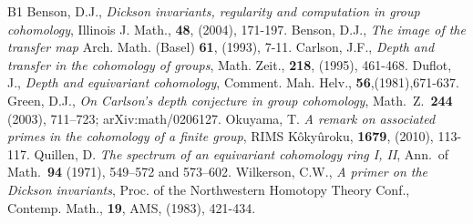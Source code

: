 \documentclass[reqno]{amsart}
\theoremstyle{plain}%
\theoremstyle{definition}
\theoremstyle{remark}
\begin{document}
\begin{thebibliography}{B1}
 Benson, D.J., \emph{ Dickson invariants, regularity and computation in group cohomology}, Illinois J. Math., \textbf{48}, (2004), 171-197.
 Benson, D.J., \emph{The image of the transfer map} Arch. Math. (Basel) \textbf{61}, (1993), 7-11.
 Carlson, J.F., \emph{Depth and transfer in the cohomology of groups}, Math. Zeit., \textbf{218}, (1995), 461-468.
 Duflot, J., \emph{Depth and equivariant cohomology}, Comment. Mah. Helv., \textbf{56},(1981),671-637.
 Green, D.J., \emph{On Carlson's depth conjecture in group cohomology}, Math.\ Z.\ \textbf{244} (2003), 711--723; arXiv:math/0206127.
 Okuyama, T. \emph{A remark on associated primes in the cohomology of a finite group}, RIMS K\^oky\^uroku, \textbf {1679}, (2010), 113-117.
 Quillen, D. \emph{The spectrum of an equivariant cohomology ring I, II}, Ann.\ of Math.\ \textbf{94} (1971), 549--572 and 573--602.
 Wilkerson, C.W., \emph{A primer on the Dickson invariants}, Proc. of the Northwestern Homotopy Theory Conf., Contemp. Math., \textbf{19}, AMS, (1983), 421-434. 
\end{thebibliography}
\end{document}
